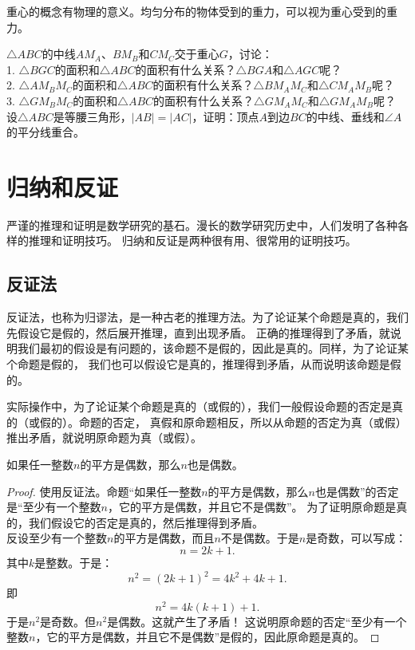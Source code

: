 \documentclass[12pt,UTF8]{ctexbook}
\begin{document}
重心的概念有物理的意义。均匀分布的物体受到的重力，可以视为重心受到的重力。
\begin{xt}\label{xt:1-3-0}
    $\triangle ABC$的中线$AM_A$、$BM_B$和$CM_C$交于重心$G$，讨论：\\
    1. $\triangle BGC$的面积和$\triangle ABC$的面积有什么关系？$\triangle BGA$和$\triangle AGC$呢？\\
    2. $\triangle AM_BM_C$的面积和$\triangle ABC$的面积有什么关系？$\triangle BM_AM_C$和$\triangle CM_AM_B$呢？\\
    3. $\triangle GM_BM_C$的面积和$\triangle ABC$的面积有什么关系？$\triangle GM_AM_C$和$\triangle GM_AM_B$呢？\\
    设$\triangle ABC$是等腰三角形，$|AB| = |AC|$，证明：顶点$A$到边$BC$的中线、垂线和$\angle A$的平分线重合。\\
\end{xt}

\chapter{归纳和反证}
严谨的推理和证明是数学研究的基石。漫长的数学研究历史中，人们发明了各种各样的推理和证明技巧。
归纳和反证是两种很有用、很常用的证明技巧。

\section{反证法}
反证法，也称为归谬法，是一种古老的推理方法。为了论证某个命题是真的，我们先假设它是假的，然后展开推理，直到出现矛盾。
正确的推理得到了矛盾，就说明我们最初的假设是有问题的，该命题不是假的，因此是真的。同样，为了论证某个命题是假的，
我们也可以假设它是真的，推理得到矛盾，从而说明该命题是假的。

实际操作中，为了论证某个命题是真的（或假的），我们一般假设命题的否定是真的（或假的）。命题的否定，
真假和原命题相反，所以从命题的否定为真（或假）推出矛盾，就说明原命题为真（或假）。

\begin{ex}\label{ex:2-0-0}
    如果任一整数$n$的平方是偶数，那么$n$也是偶数。
\end{ex}
\begin{proof}
    使用反证法。命题“如果任一整数$n$的平方是偶数，那么$n$也是偶数”的否定是“至少有一个整数$n$，它的平方是偶数，并且它不是偶数”。
    为了证明原命题是真的，我们假设它的否定是真的，然后推理得到矛盾。\\
    反设至少有一个整数$n$的平方是偶数，而且$n$不是偶数。于是$n$是奇数，可以写成：
    $$ n = 2k+1.$$
    其中$k$是整数。于是：
    $$ n^2 = (2k+1)^2 = 4k^2 + 4k + 1.$$
    即
    $$ n^2 = 4k(k+1)+1.$$
    于是$n^2$是奇数。但$n^2$是偶数。这就产生了矛盾！
    这说明原命题的否定“至少有一个整数$n$，它的平方是偶数，并且它不是偶数”是假的，因此原命题是真的。
\end{proof}
\end{document}
